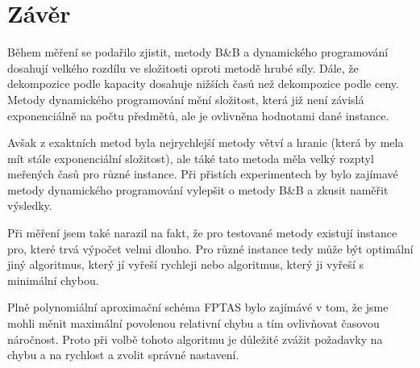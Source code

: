 \documentclass[11pt]{article}
\begin{document}
\section{Závěr}
Během měření se podařilo zjistit, metody B\&B a dynamického programování dosahují velkého rozdílu ve složitosti oproti metodě hrubé síly. Dále, že dekompozice podle kapacity dosahuje nižších časů než dekompozice podle ceny. Metody dynamického programování mění složitost, která již není závislá exponenciálně na počtu předmětů, ale je ovlivněna hodnotami dané instance.

 Avšak z exaktních metod byla nejrychlejší metody větví a hranic (která by mela mít stále exponenciální složitost), ale táké tato metoda měla velký rozptyl meřených časů pro různé instance. Při přistích experimentech by bylo zajímavé metody dynamického programování vylepšit o metody B\&B a zkusit naměřit výsledky.

Při měření jsem také narazil na fakt, že pro testované metody existují instance pro, které trvá výpočet velmi dlouho. Pro různé instance tedy může být optimální jiný algoritmus, který jí vyřeší rychleji nebo algoritmus, který ji vyřeší s minimální chybou.

Plně polynomiální aproximační schéma FPTAS bylo zajímávé v tom, že jsme mohli měnit maximální povolenou relativní chybu a tím ovlivňovat časovou náročnost. Proto při volbě tohoto algoritmu je důležité zvážit požadavky na chybu a na rychlost a zvolit správné nastavení.
\end{document}
